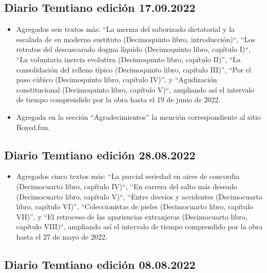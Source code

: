 \documentclass[
]{book}
\providecommand{\tightlist}{%
  \setlength{\itemsep}{0pt}\setlength{\parskip}{0pt}}
\begin{document}
\hypertarget{diario-temtiano-ediciuxf3n-17.09.2022}{%
\subsection*{Diario Temtiano edición 17.09.2022}\label{diario-temtiano-ediciuxf3n-17.09.2022}}

\begin{itemize}
\item
  Agregados seis textos más: ``La merma del saborizado dictatorial y la escalada de su moderno sustituto (Decimoquinto libro, introducción)``, ``Los retratos del descascarado dogma líquido (Decimoquinto libro, capítulo I)``, ``La voluntaria inercia evolutiva (Decimoquinto libro, capítulo II)'', ``La consolidación del relleno típico (Decimoquinto libro, capítulo III)'', ``Por el paso cúbico (Decimoquinto libro, capítulo IV)'', y ``Agudización constitucional (Decimoquinto libro, capítulo V)``, ampliando así el intervalo de tiempo comprendido por la obra hasta el 19 de junio de 2022.
\item
  Agregada en la sección ``Agradecimientos'' la mención correspondiente al sitio Boxed.fun.
\end{itemize}

\hypertarget{diario-temtiano-ediciuxf3n-28.08.2022}{%
\subsection*{Diario Temtiano edición 28.08.2022}\label{diario-temtiano-ediciuxf3n-28.08.2022}}

\begin{itemize}
\tightlist
\item
  Agregados cinco textos más: ``La parcial seriedad en aires de concordia (Decimocuarto libro, capítulo IV)``, ``En carrera del salto más deseado (Decimocuarto libro, capítulo V)``, ``Entre desvíos y accidentes (Decimocuarto libro, capítulo VI)'', ``Coleccionistas de pieles (Decimocuarto libro, capítulo VII)'', y ``El retroceso de las apariencias extranjeras (Decimocuarto libro, capítulo VIII)``, ampliando así el intervalo de tiempo comprendido por la obra hasta el 27 de mayo de 2022.
\end{itemize}

\hypertarget{diario-temtiano-ediciuxf3n-08.08.2022}{%
\subsection*{Diario Temtiano edición 08.08.2022}\label{diario-temtiano-ediciuxf3n-08.08.2022}}
\end{document}
